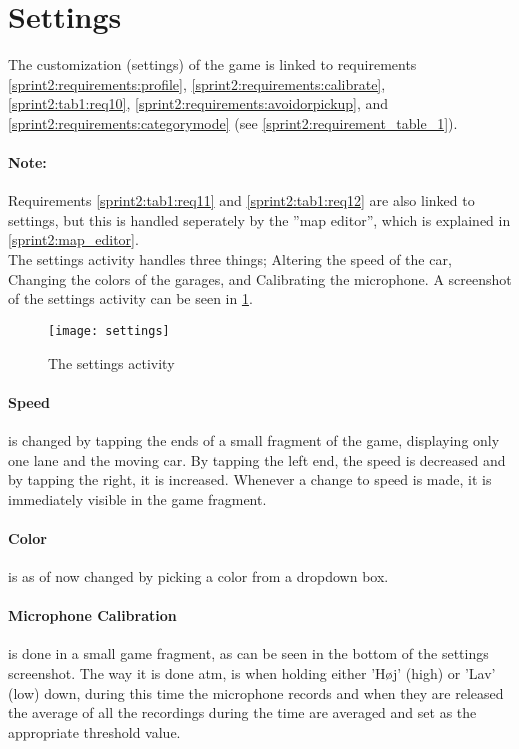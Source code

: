 \section{Settings}

The customization (settings) of the game is linked to requirements \ref{sprint2:requirements:profile}, \ref{sprint2:requirements:calibrate}, \ref{sprint2:tab1:req10}, \ref{sprint2:requirements:avoidorpickup}, and \ref{sprint2:requirements:categorymode} (see \cref{sprint2:requirement_table_1}).

\paragraph{Note:} Requirements \ref{sprint2:tab1:req11} and \ref{sprint2:tab1:req12} are also linked to settings, but this is handled seperately by the ''map editor'', which is explained in \cref{sprint2:map_editor}.\\

\noindent
The settings activity handles three things; Altering the speed of the car, Changing the colors of the garages, and Calibrating the microphone.
A screenshot of the settings activity can be seen in \cref{sprint2:settings:fig}.

\begin{center}
\begin{figure}
\texttt{[image: settings]}
\caption{The settings activity}
\label{sprint2:settings:fig}
\end{figure}
\end{center}

\paragraph{Speed} is changed by tapping the ends of a small fragment of the game, displaying only one lane and the moving car.
By tapping the left end, the speed is decreased and by tapping the right, it is increased.
Whenever a change to speed is made, it is immediately visible in the game fragment.

\paragraph{Color} is as of now changed by picking a color from a dropdown box.

\paragraph{Microphone Calibration} is done in a small game fragment, as can be seen in the bottom of the settings screenshot.
The way it is done atm, is when holding either 'H\o j' (high) or 'Lav' (low) down, during this time the microphone records and when they are released the average of all the recordings during the time are averaged and set as the appropriate threshold value.
